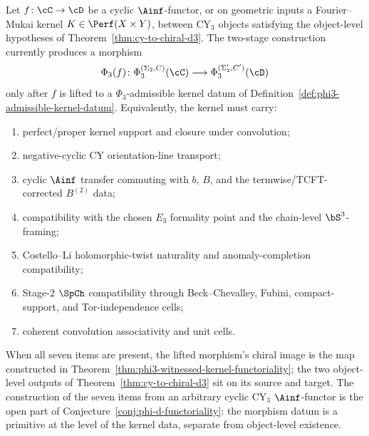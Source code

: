 \begin{proposition}
\label{prop:phi3-arbitrary-morphism-obstruction-criterion}
Let $f\colon\cC\to\cD$ be a cyclic $\Ainf$-functor, or on geometric
inputs a Fourier--Mukai kernel $K\in\Perf(X\times Y)$, between
CY$_3$ objects satisfying the object-level hypotheses of
Theorem~\ref{thm:cy-to-chiral-d3}. The two-stage construction
currently produces a morphism
\[
 \Phi_3(f)\colon
 \Phi_3^{(\Sigma_2,C)}(\cC)\longrightarrow
 \Phi_3^{(\Sigma'_2,C')}(\cD)
\]
only after $f$ is lifted to a $\Phi_3$-admissible kernel datum of
Definition~\ref{def:phi3-admissible-kernel-datum}. Equivalently, the
kernel must carry:
\begin{enumerate}[label=\textup{(O\arabic*)}]
 \item perfect/proper kernel support and closure under convolution;
 \item negative-cyclic CY orientation-line transport;
 \item cyclic $\Ainf$ transfer commuting with $b$, $B$, and the
 termwise/TCFT-corrected $B^{(2)}$ data;
 \item compatibility with the chosen $E_3$ formality point and the
 chain-level $\bS^3$-framing;
 \item Costello--Li holomorphic-twist naturality and anomaly-completion
 compatibility;
 \item Stage-$2$ $\SpCh$ compatibility through Beck--Chevalley,
 Fubini, compact-support, and Tor-independence cells;
 \item coherent convolution associativity and unit cells.
\end{enumerate}
When all seven items are present, the lifted morphism's chiral image
is the map constructed in
Theorem~\ref{thm:phi3-witnessed-kernel-functoriality}; the two
object-level outputs of Theorem~\ref{thm:cy-to-chiral-d3} sit on its
source and target. The construction of the seven items from an
arbitrary cyclic CY$_3$ $\Ainf$-functor is the open part of
Conjecture~\ref{conj:phi-d-functoriality}: the morphism datum is a
primitive at the level of the kernel data, separate from object-level
existence.
\end{proposition}

